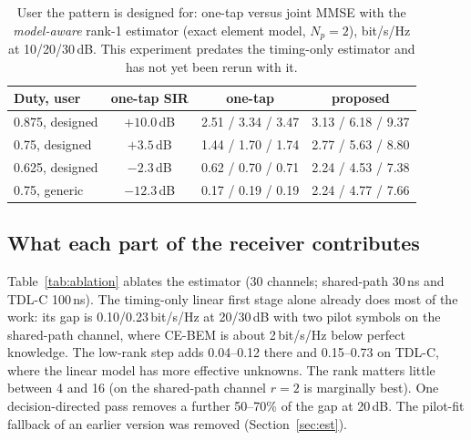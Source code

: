 \begin{table}[!htbp]\centering
\caption{User the pattern is designed for: one-tap versus joint MMSE with the \emph{model-aware} rank-1 estimator (exact element model, $N_p=2$), bit/s/Hz at 10/20/30\,dB. This experiment predates the timing-only estimator and has not yet been rerun with it.}\label{tab:designed}
\begin{tabular}{lccc}\toprule
Duty, user & one-tap SIR & one-tap & proposed \\\midrule
0.875, designed & $+10.0$\,dB & 2.51 / 3.34 / 3.47 & 3.13 / 6.18 / 9.37 \\
0.75, designed & $+3.5$\,dB & 1.44 / 1.70 / 1.74 & 2.77 / 5.63 / 8.80 \\
0.625, designed & $-2.3$\,dB & 0.62 / 0.70 / 0.71 & 2.24 / 4.53 / 7.38 \\
0.75, generic & $-12.3$\,dB & 0.17 / 0.19 / 0.19 & 2.24 / 4.77 / 7.66 \\\bottomrule
\end{tabular}
\end{table}

\subsection{What each part of the receiver contributes}\label{sec:res-ablation}
Table~\ref{tab:ablation} ablates the estimator (30 channels; shared-path 30\,ns and TDL-C 100\,ns). The timing-only
linear first stage alone already does most of the work: its gap is 0.10/0.23\,bit/s/Hz at 20/30\,dB with two pilot
symbols on the shared-path channel, where CE-BEM is about 2\,bit/s/Hz below perfect knowledge. The low-rank step adds
0.04--0.12 there and 0.15--0.73 on TDL-C, where the linear model has more effective unknowns. The rank matters little
between 4 and 16 (on the shared-path channel $r=2$ is marginally best). One decision-directed pass removes a further
50--70\% of the gap at 20\,dB. The pilot-fit fallback of an earlier version was removed (Section~\ref{sec:est}).

